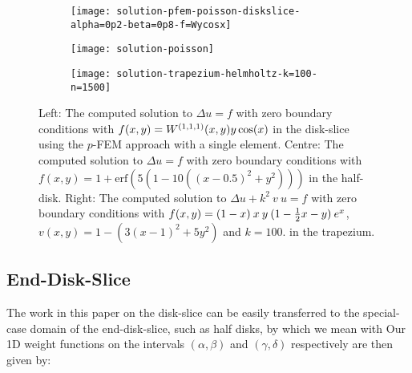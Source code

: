 \begin{figure}[t]
	\begin{subfigure}{0.3\textwidth}
	\texttt{[image: solution-pfem-poisson-diskslice-alpha=0p2-beta=0p8-f=Wycosx]}
	\centering
	\end{subfigure}
	\begin{subfigure}{0.3\textwidth}
	\texttt{[image: solution-poisson]}
	\centering
	\end{subfigure}
	\begin{subfigure}{0.3\textwidth}
	\texttt{[image: solution-trapezium-helmholtz-k=100-n=1500]}
	\centering
	\end{subfigure}
	\centering
	\caption{Left: The computed solution to $\Delta u = f$ with zero boundary conditions with $f(x,y) = W^{(1,1,1)}(x,y) y \cos(x)$ in the disk-slice using the $p$-FEM approach with a single element. Centre: The computed solution to $\Delta u = f$ with zero boundary conditions with $f(x,y) = 1 + \text{erf}(5(1 - 10((x - 0.5)^2 + y^2)))$ in the half-disk. Right: The computed solution to $\Delta u + k^2 \: v \: u = f$ with zero boundary conditions with $f(x,y) = (1-x) \: x \: y \: (1- \frac{1}{2} x - y) \: e^x$, $v(x,y) = 1 - (3(x-1)^2 + 5y^2)$ and $k = 100$. in the trapezium.}
	\centering
	\label{fig:ds:trappfem}
\end{figure}

\subsection{End-Disk-Slice}\label{section:ds:enddiskslice}

The work in this paper on the disk-slice can be easily transferred to the special-case domain of the end-disk-slice, such as half disks, by which we mean
with
Our 1D weight functions on the intervals $(\alpha, \beta)$ and $(\gamma, \delta)$ respectively are then given by:

